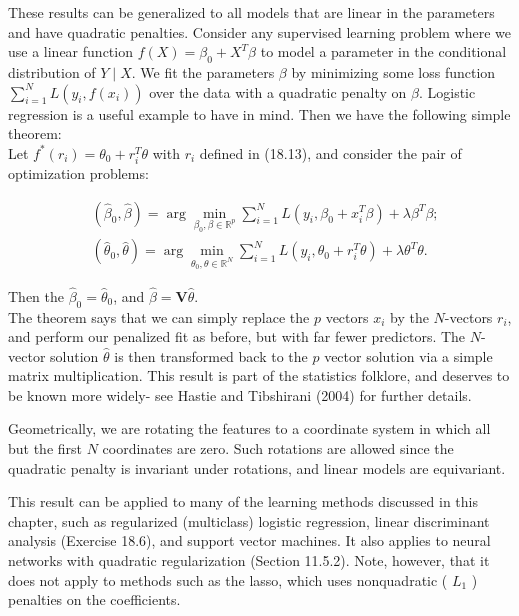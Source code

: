 \documentclass[10pt]{article}
\begin{document}
These results can be generalized to all models that are linear in the parameters and have quadratic penalties. Consider any supervised learning problem where we use a linear function $f(X)=\beta_{0}+X^{T} \beta$ to model a parameter in the conditional distribution of $Y \mid X$. We fit the parameters $\beta$ by minimizing some loss function $\sum_{i=1}^{N} L\left(y_{i}, f\left(x_{i}\right)\right)$ over the data with a quadratic penalty on $\beta$. Logistic regression is a useful example to have in mind. Then we have the following simple theorem:\\
Let $f^{*}\left(r_{i}\right)=\theta_{0}+r_{i}^{T} \theta$ with $r_{i}$ defined in (18.13), and consider the pair of optimization problems:


\begin{align*}
& \left(\hat{\beta}_{0}, \hat{\beta}\right)=\arg \min _{\beta_{0}, \beta \in \mathbb{R}^{p}} \sum_{i=1}^{N} L\left(y_{i}, \beta_{0}+x_{i}^{T} \beta\right)+\lambda \beta^{T} \beta ;  \tag{18.16}\\
& \left(\hat{\theta}_{0}, \hat{\theta}\right)=\arg \min _{\theta_{0}, \theta \in \mathbb{R}^{N}} \sum_{i=1}^{N} L\left(y_{i}, \theta_{0}+r_{i}^{T} \theta\right)+\lambda \theta^{T} \theta . \tag{18.17}
\end{align*}


Then the $\hat{\beta}_{0}=\hat{\theta}_{0}$, and $\hat{\beta}=\mathbf{V} \hat{\theta}$.\\
The theorem says that we can simply replace the $p$ vectors $x_{i}$ by the $N$-vectors $r_{i}$, and perform our penalized fit as before, but with far fewer predictors. The $N$-vector solution $\hat{\theta}$ is then transformed back to the $p$ vector solution via a simple matrix multiplication. This result is part of the statistics folklore, and deserves to be known more widely- see Hastie and Tibshirani (2004) for further details.

Geometrically, we are rotating the features to a coordinate system in which all but the first $N$ coordinates are zero. Such rotations are allowed since the quadratic penalty is invariant under rotations, and linear models are equivariant.

This result can be applied to many of the learning methods discussed in this chapter, such as regularized (multiclass) logistic regression, linear discriminant analysis (Exercise 18.6), and support vector machines. It also applies to neural networks with quadratic regularization (Section 11.5.2). Note, however, that it does not apply to methods such as the lasso, which uses nonquadratic ( $L_{1}$ ) penalties on the coefficients.
\end{document}
